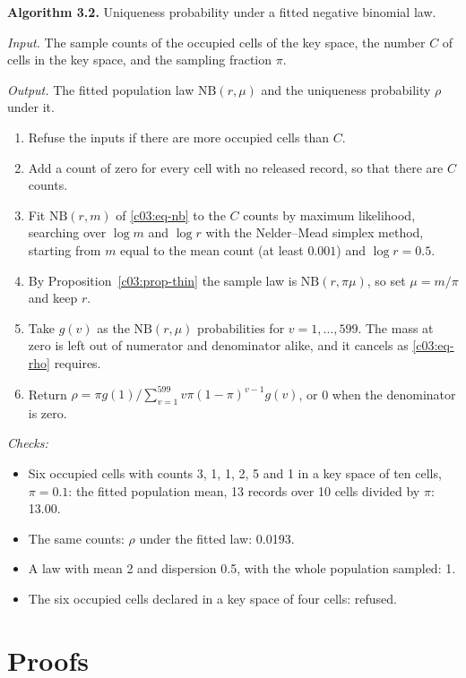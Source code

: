 \begin{mdframed}[linecolor=gray!60,backgroundcolor=gray!5]
\medskip
\textbf{Algorithm 3.2.} Uniqueness probability under a fitted negative binomial law.\par\smallskip
\textit{Input.} The sample counts of the occupied cells of the key space, the number $C$ of cells in the key space, and the sampling fraction $\pi$.\par
\textit{Output.} The fitted population law $\mathrm{NB}(r,\mu)$ and the uniqueness probability $\rho$ under it.
\begin{enumerate}
\item Refuse the inputs if there are more occupied cells than $C$.
\item Add a count of zero for every cell with no released record, so that there are $C$ counts.
\item Fit $\mathrm{NB}(r,m)$ of \eqref{c03:eq-nb} to the $C$ counts by maximum likelihood, searching over $\log m$ and $\log r$ with the Nelder--Mead simplex method, starting from $m$ equal to the mean count (at least $0.001$) and $\log r=0.5$.
\item By Proposition~\ref{c03:prop-thin} the sample law is $\mathrm{NB}(r,\pi\mu)$, so set $\mu=m/\pi$ and keep $r$.
\item Take $g(v)$ as the $\mathrm{NB}(r,\mu)$ probabilities for $v=1,\dots,599$. The mass at zero is left out of numerator and denominator alike, and it cancels as \eqref{c03:eq-rho} requires.
\item Return $\rho=\pi g(1)\big/\sum_{v=1}^{599}v\pi(1-\pi)^{v-1}g(v)$, or 0 when the denominator is zero.
\end{enumerate}
\textit{Checks:}
\begin{itemize}
\item Six occupied cells with counts 3, 1, 1, 2, 5 and 1 in a key space of ten cells, $\pi=0.1$: the fitted population mean, 13 records over 10 cells divided by $\pi$: 13.00.
\item The same counts: $\rho$ under the fitted law: 0.0193.
\item A law with mean 2 and dispersion 0.5, with the whole population sampled: 1.
\item The six occupied cells declared in a key space of four cells: refused.
\end{itemize}
\end{mdframed}

\section{Proofs}

